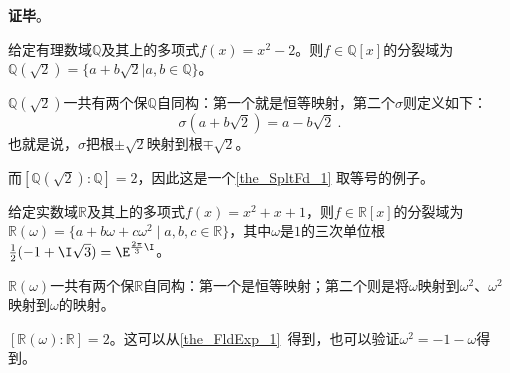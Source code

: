 










\textbf{证毕}。





\begin{example}{}

给定有理数域$\mathbb{Q}$及其上的多项式$f(x)=x^2-2$。则$f\in\mathbb{Q}[x]$的分裂域为$\mathbb{Q}(\sqrt{2})=\{a+b\sqrt{2}|a, b\in\mathbb{Q}\}$。

$\mathbb{Q}(\sqrt{2})$一共有两个保$\mathbb{Q}$自同构：第一个就是恒等映射，第二个$\sigma$则定义如下：
\begin{equation}
\sigma(a+b\sqrt{2})=a-b\sqrt{2}~.
\end{equation}
也就是说，$\sigma$把根$\pm\sqrt{2}$映射到根$\mp\sqrt{2}$。


而$[\mathbb{Q}(\sqrt{2}):\mathbb{Q}]=2$，因此这是一个\autoref{the_SpltFd_1} 取等号的例子。

\end{example}


\begin{example}{}
给定实数域$\mathbb{R}$及其上的多项式$f(x)=x^2+x+1$，则$f\in\mathbb{R}[x]$的分裂域为$\mathbb{R}(\omega)=\{a+b\omega+c\omega^2 \mid a, b, c\in\mathbb{R}\}$，其中$\omega$是$1$的三次单位根$\frac{1}{2}(-1+\I\sqrt{3})=\E^{\frac{2\pi}{3}\I}$。

$\mathbb{R}(\omega)$一共有两个保$\mathbb{R}$自同构：第一个是恒等映射；第二个则是将$\omega$映射到$\omega^2$、$\omega^2$映射到$\omega$的映射。

$[\mathbb{R}(\omega):\mathbb{R}]=2$。这可以从\autoref{the_FldExp_1}~得到，也可以验证$\omega^2=-1-\omega$得到。
\end{example}



